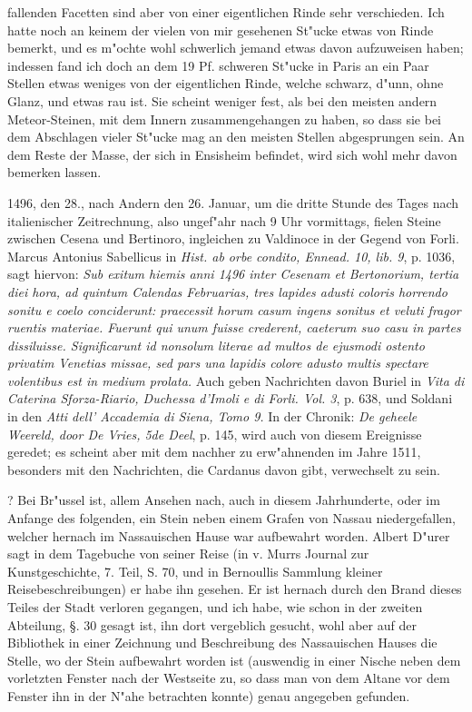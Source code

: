 \documentclass[a4paper, 11pt, oneside, polutonikogreek, german]{article}
\begin{document}
fallenden Facetten sind aber von einer eigentlichen Rinde sehr verschieden. Ich hatte noch an keinem der vielen von mir gesehenen St"ucke etwas von Rinde bemerkt, und es m"ochte wohl schwerlich jemand etwas davon aufzuweisen haben; indessen fand ich doch an dem 19 Pf. schweren St"ucke in Paris an ein Paar Stellen etwas weniges von der eigentlichen Rinde, welche schwarz, d"unn, ohne Glanz, und etwas rau ist. Sie scheint weniger fest, als bei den meisten andern Meteor-Steinen, mit dem Innern zusammengehangen zu haben, so dass sie bei dem Abschlagen vieler St"ucke mag an den meisten Stellen abgesprungen sein. An dem Reste der Masse, der sich in Ensisheim befindet, wird sich wohl mehr davon bemerken lassen.

1496, den 28., nach Andern den 26. Januar, um die dritte Stunde des Tages nach italienischer Zeitrechnung, also ungef"ahr nach 9 Uhr vormittags, fielen Steine zwischen Cesena und Bertinoro, ingleichen zu Valdinoce in der Gegend von Forli. Marcus Antonius Sabellicus in \emph{Hist. ab orbe condito, Ennead. 10, lib. 9}, p. 1036, sagt hiervon: \emph{Sub exitum hiemis anni 1496 inter Cesenam et Bertonorium, tertia diei hora, ad quintum Calendas Februarias, tres lapides adusti coloris horrendo sonitu e coelo conciderunt: praecessit horum casum ingens sonitus et veluti fragor ruentis materiae. Fuerunt qui unum fuisse crederent, caeterum suo casu in partes dissiluisse. Significarunt id nonsolum literae ad multos de ejusmodi ostento privatim Venetias missae, sed pars una lapidis colore adusto multis spectare volentibus est in medium prolata.} Auch geben Nachrichten davon Buriel in \emph{Vita di Caterina Sforza-Riario, Duchessa d'Imoli e di Forli. Vol. 3}, p. 638, und Soldani in den \emph{Atti dell' Accademia di Siena, Tomo 9.} In der Chronik: \emph{De geheele Weereld, door De Vries, 5de Deel}, p. 145, wird auch von diesem Ereignisse geredet; es scheint aber mit dem nachher zu erw"ahnenden im Jahre 1511, besonders mit den Nachrichten, die Cardanus davon gibt, verwechselt zu sein.

? Bei Br"ussel ist, allem Ansehen nach, auch in diesem Jahrhunderte, oder im Anfange des folgenden, ein Stein neben einem Grafen von Nassau niedergefallen, welcher hernach im Nassauischen Hause war aufbewahrt worden. Albert D"urer sagt in dem Tagebuche von seiner Reise (in v. Murrs Journal zur Kunstgeschichte, 7. Teil, S. 70, und in Bernoullis Sammlung kleiner Reisebeschreibungen) er habe ihn gesehen. Er ist hernach durch den Brand dieses Teiles der Stadt verloren gegangen, und ich habe, wie schon in der zweiten Abteilung, §. 30 gesagt ist, ihn dort vergeblich gesucht, wohl aber auf der Bibliothek in einer Zeichnung und Beschreibung des Nassauischen Hauses die Stelle, wo der Stein aufbewahrt worden ist (auswendig in einer Nische neben dem vorletzten Fenster nach der Westseite zu, so dass man von dem Altane vor dem Fenster ihn in der N"ahe betrachten konnte) genau angegeben gefunden.
\end{document}
